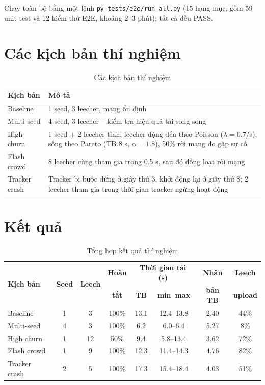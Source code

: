 \documentclass[12pt,a4paper,oneside]{report}
\begin{document}
Chạy toàn bộ bằng một lệnh \texttt{py tests/e2e/run\_all.py} (15 hạng mục, gồm 59 unit test và 12 kiểm thử E2E, khoảng 2--3 phút); tất cả đều PASS.

\section{Các kịch bản thí nghiệm}

\begin{table}[H]
\centering
\caption{Các kịch bản thí nghiệm}
\begin{tabularx}{\textwidth}{@{}lL@{}}
\toprule
\textbf{Kịch bản} & \textbf{Mô tả}\\\midrule
Baseline & 1 seed, 3 leecher, mạng ổn định\\
Multi-seed & 4 seed, 3 leecher -- kiểm tra hiệu quả tải song song\\
High churn & 1 seed + 2 leecher tĩnh; leecher động đến theo Poisson ($\lambda = 0.7$/s), sống theo Pareto (TB 8 s, $\alpha=1.8$), 50\% rời mạng do gặp sự cố\\
Flash crowd & 8 leecher cùng tham gia trong 0.5 s, sau đó đồng loạt rời mạng\\
Tracker crash & Tracker bị buộc dừng ở giây thứ 3, khởi động lại ở giây thứ 8; 2 leecher tham gia trong thời gian tracker ngừng hoạt động\\
\bottomrule
\end{tabularx}
\end{table}

\section{Kết quả}

\begin{table}[H]
\centering
\caption{Tổng hợp kết quả thí nghiệm}
\label{tab:ketqua}
\small
\begin{tabular}{@{}lccccccc@{}}
\toprule
\multirow{2}{*}{\textbf{Kịch bản}} & \multirow{2}{*}{\textbf{Seed}} & \multirow{2}{*}{\textbf{Leech}} & \textbf{Hoàn} & \multicolumn{2}{c}{\textbf{Thời gian tải (s)}} & \textbf{Nhân} & \textbf{Leech}\\
\cmidrule(lr){5-6}
 & & & \textbf{tất} & \textbf{TB} & \textbf{min--max} & \textbf{bản TB} & \textbf{upload}\\\midrule
Baseline      & 1 & 3  & 100\% & 13.1 & 12.4--13.8 & 2.40 & 44\%\\
Multi-seed    & 4 & 3  & 100\% & 6.2  & 6.0--6.4   & 5.27 & 8\%\\
High churn    & 1 & 12 & 50\%  & 9.4  & 5.8--13.4  & 3.62 & 72\%\\
Flash crowd   & 1 & 9  & 100\% & 12.3 & 11.4--14.3 & 4.76 & 82\%\\
Tracker crash & 2 & 5  & 100\% & 17.3 & 15.4--18.4 & 4.03 & 51\%\\
\bottomrule
\end{tabular}
\end{table}
\end{document}

